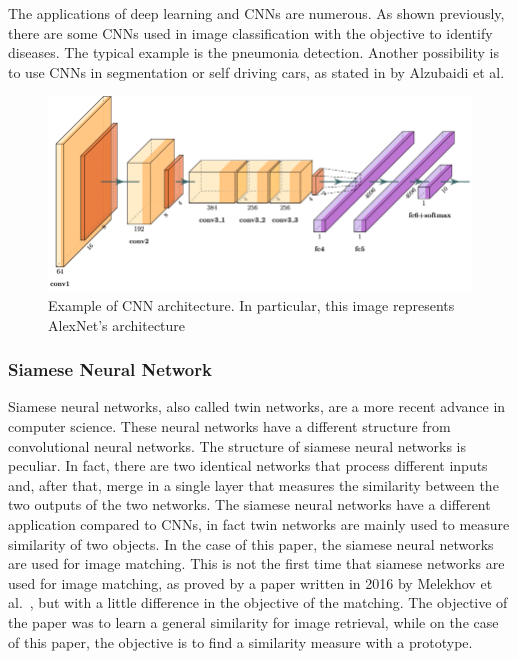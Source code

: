 \documentclass[conference]{IEEEtran}
\begin{document}
					The applications of deep learning and CNNs are numerous. As shown previously, there are some CNNs used in image classification with the objective to identify diseases. The typical example is 
					the pneumonia detection. Another possibility is to use CNNs in segmentation or self driving cars, as stated in \cite{alzubaidi2021review} by Alzubaidi et al.
			
					\begin{figure}[!ht]
						\centerline{\includegraphics[width=\linewidth]{imgs/cnn_architecture.png}}
						\caption{Example of CNN architecture. In particular, this image represents AlexNet's architecture}
						\label{fig:5}
					\end{figure}
			
				\subsubsection{Siamese Neural Network}

					Siamese neural networks, also called twin networks, are a more recent advance in computer science. These neural networks have a different structure from convolutional neural networks. The 
					structure of siamese neural networks is peculiar. In fact, there are two identical networks that process different inputs and, after that, merge in a single layer that measures the similarity between 
					the two outputs of the two networks. The siamese neural networks have a different application compared to CNNs, in fact twin networks are mainly used to measure similarity of two objects. 
					In the case of this paper, the siamese neural networks are used for image matching. This is not the first time that siamese networks are used for image matching, as proved by a paper written in 2016 by 
					Melekhov et al.~\cite{melekhov2016siamese}, but with a little difference in the objective of the matching. The objective of the paper was to learn a general similarity for image retrieval, while on the case of this 
					paper, the objective is to find a similarity measure with a prototype. 
					
\end{document}
